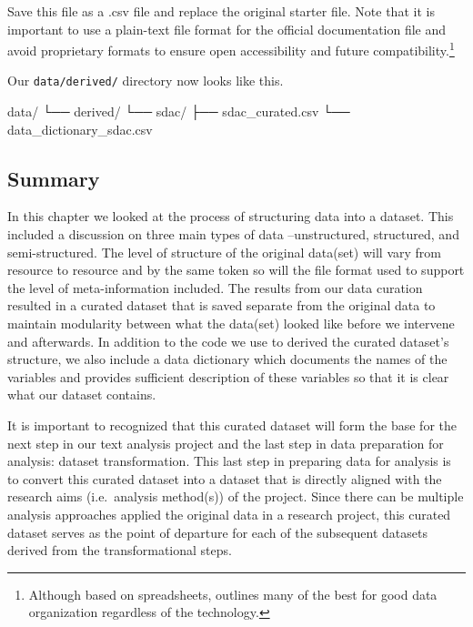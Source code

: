 \documentclass[
]{article}
\newenvironment{Shaded}{\begin{snugshade}}{\end{snugshade}}
\newcommand{\ExtensionTok}[1]{#1}
\newcommand{\NormalTok}[1]{#1}
\begin{document}
Save this file as a .csv file and replace the original starter file. Note that it is important to use a plain-text file format for the official documentation file and avoid proprietary formats to ensure open accessibility and future compatibility.\footnote{Although based on spreadsheets, \citet{Broman2018} outlines many of the best for good data organization regardless of the technology.}

Our \texttt{data/derived/} directory now looks like this.

\begin{Shaded}
\begin{Highlighting}[]
\ExtensionTok{data/}
\ExtensionTok{└──}\NormalTok{ derived/}
    \ExtensionTok{└──}\NormalTok{ sdac/}
        \ExtensionTok{├──}\NormalTok{ sdac\_curated.csv}
        \ExtensionTok{└──}\NormalTok{ data\_dictionary\_sdac.csv}
\end{Highlighting}
\end{Shaded}

\hypertarget{summary-8}{%
\subsection{Summary}\label{summary-8}}

In this chapter we looked at the process of structuring data into a dataset. This included a discussion on three main types of data --unstructured, structured, and semi-structured. The level of structure of the original data(set) will vary from resource to resource and by the same token so will the file format used to support the level of meta-information included. The results from our data curation resulted in a curated dataset that is saved separate from the original data to maintain modularity between what the data(set) looked like before we intervene and afterwards. In addition to the code we use to derived the curated dataset's structure, we also include a data dictionary which documents the names of the variables and provides sufficient description of these variables so that it is clear what our dataset contains.

It is important to recognized that this curated dataset will form the base for the next step in our text analysis project and the last step in data preparation for analysis: dataset transformation. This last step in preparing data for analysis is to convert this curated dataset into a dataset that is directly aligned with the research aims (i.e.~analysis method(s)) of the project. Since there can be multiple analysis approaches applied the original data in a research project, this curated dataset serves as the point of departure for each of the subsequent datasets derived from the transformational steps.
\end{document}
